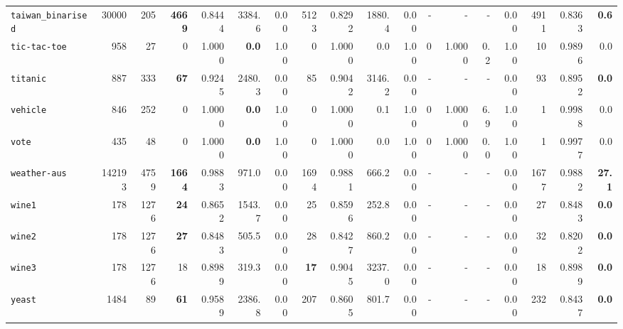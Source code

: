 \begin{tabular}{lccrrrrrrrrrrrrrrr}
\texttt{taiwan\_binarised} & \multicolumn{1}{r}{30000} & \multicolumn{1}{r}{205}  & \textbf{4669} & 0.8444 & 3384.6 & 0.00 & 5123 & 0.8292 & 1880.4 & 0.00 & - & - & - & 0.00 & 4911 & 0.8363 & \textbf{0.6}\\
\texttt{tic-tac-toe} & \multicolumn{1}{r}{958} & \multicolumn{1}{r}{27}  & 0 & 1.0000 & \textbf{0.0} & 1.00 & 0 & 1.0000 & 0.0 & 1.00 & 0 & 1.0000 & 0.2 & 1.00 & 10 & 0.9896 & 0.0\\
\texttt{titanic} & \multicolumn{1}{r}{887} & \multicolumn{1}{r}{333}  & \textbf{67} & 0.9245 & 2480.3 & 0.00 & 85 & 0.9042 & 3146.2 & 0.00 & - & - & - & 0.00 & 93 & 0.8952 & \textbf{0.0}\\
\texttt{vehicle} & \multicolumn{1}{r}{846} & \multicolumn{1}{r}{252}  & 0 & 1.0000 & \textbf{0.0} & 1.00 & 0 & 1.0000 & 0.1 & 1.00 & 0 & 1.0000 & 6.9 & 1.00 & 1 & 0.9988 & 0.0\\
\texttt{vote} & \multicolumn{1}{r}{435} & \multicolumn{1}{r}{48}  & 0 & 1.0000 & \textbf{0.0} & 1.00 & 0 & 1.0000 & 0.0 & 1.00 & 0 & 1.0000 & 0.0 & 1.00 & 1 & 0.9977 & 0.0\\
\texttt{weather-aus} & \multicolumn{1}{r}{142193} & \multicolumn{1}{r}{4759}  & \textbf{1664} & 0.9883 & 971.0 & 0.00 & 1694 & 0.9881 & 666.2 & 0.00 & - & - & - & 0.00 & 1677 & 0.9882 & \textbf{27.1}\\
\texttt{wine1} & \multicolumn{1}{r}{178} & \multicolumn{1}{r}{1276}  & \textbf{24} & 0.8652 & 1543.7 & 0.00 & 25 & 0.8596 & 252.8 & 0.00 & - & - & - & 0.00 & 27 & 0.8483 & \textbf{0.0}\\
\texttt{wine2} & \multicolumn{1}{r}{178} & \multicolumn{1}{r}{1276}  & \textbf{27} & 0.8483 & 505.5 & 0.00 & 28 & 0.8427 & 860.2 & 0.00 & - & - & - & 0.00 & 32 & 0.8202 & \textbf{0.0}\\
\texttt{wine3} & \multicolumn{1}{r}{178} & \multicolumn{1}{r}{1276}  & 18 & 0.8989 & 319.3 & 0.00 & \textbf{17} & 0.9045 & 3237.0 & 0.00 & - & - & - & 0.00 & 18 & 0.8989 & \textbf{0.0}\\
\texttt{yeast} & \multicolumn{1}{r}{1484} & \multicolumn{1}{r}{89}  & \textbf{61} & 0.9589 & 2386.8 & 0.00 & 207 & 0.8605 & 801.7 & 0.00 & - & - & - & 0.00 & 232 & 0.8437 & \textbf{0.0}\\
\bottomrule
\end{tabular}
